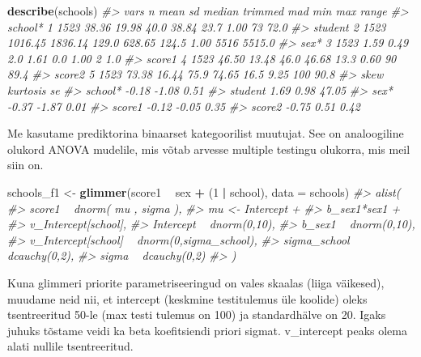 \documentclass[]{book}
\newenvironment{Shaded}{\begin{snugshade}}{\end{snugshade}}
\newcommand{\KeywordTok}[1]{\textcolor[rgb]{0.13,0.29,0.53}{\textbf{#1}}}
\newcommand{\DataTypeTok}[1]{\textcolor[rgb]{0.13,0.29,0.53}{#1}}
\newcommand{\DecValTok}[1]{\textcolor[rgb]{0.00,0.00,0.81}{#1}}
\newcommand{\StringTok}[1]{\textcolor[rgb]{0.31,0.60,0.02}{#1}}
\newcommand{\CommentTok}[1]{\textcolor[rgb]{0.56,0.35,0.01}{\textit{#1}}}
\newcommand{\OperatorTok}[1]{\textcolor[rgb]{0.81,0.36,0.00}{\textbf{#1}}}
\newcommand{\NormalTok}[1]{#1}
\begin{document}
\begin{Shaded}
\begin{Highlighting}[]
\KeywordTok{describe}\NormalTok{(schools)}
\CommentTok{#>         vars    n    mean      sd median trimmed   mad  min  max  range}
\CommentTok{#> school*    1 1523   38.36   19.98   40.0   38.84  23.7 1.00   73   72.0}
\CommentTok{#> student    2 1523 1016.45 1836.14  129.0  628.65 124.5 1.00 5516 5515.0}
\CommentTok{#> sex*       3 1523    1.59    0.49    2.0    1.61   0.0 1.00    2    1.0}
\CommentTok{#> score1     4 1523   46.50   13.48   46.0   46.68  13.3 0.60   90   89.4}
\CommentTok{#> score2     5 1523   73.38   16.44   75.9   74.65  16.5 9.25  100   90.8}
\CommentTok{#>          skew kurtosis    se}
\CommentTok{#> school* -0.18    -1.08  0.51}
\CommentTok{#> student  1.69     0.98 47.05}
\CommentTok{#> sex*    -0.37    -1.87  0.01}
\CommentTok{#> score1  -0.12    -0.05  0.35}
\CommentTok{#> score2  -0.75     0.51  0.42}
\end{Highlighting}
\end{Shaded}

Me kasutame prediktorina binaarset kategoorilist muutujat. See on
analoogiline olukord ANOVA mudelile, mis võtab arvesse multiple testingu
olukorra, mis meil siin on.

\begin{Shaded}
\begin{Highlighting}[]
\NormalTok{schools_f1 <-}\StringTok{ }\KeywordTok{glimmer}\NormalTok{(score1 }\OperatorTok{~}\StringTok{ }\NormalTok{sex }\OperatorTok{+}\StringTok{ }\NormalTok{(}\DecValTok{1} \OperatorTok{|}\StringTok{ }\NormalTok{school), }\DataTypeTok{data =}\NormalTok{ schools)}
\CommentTok{#> alist(}
\CommentTok{#>     score1 ~ dnorm( mu , sigma ),}
\CommentTok{#>     mu <- Intercept +}
\CommentTok{#>         b_sex1*sex1 +}
\CommentTok{#>         v_Intercept[school],}
\CommentTok{#>     Intercept ~ dnorm(0,10),}
\CommentTok{#>     b_sex1 ~ dnorm(0,10),}
\CommentTok{#>     v_Intercept[school] ~ dnorm(0,sigma_school),}
\CommentTok{#>     sigma_school ~ dcauchy(0,2),}
\CommentTok{#>     sigma ~ dcauchy(0,2)}
\CommentTok{#> )}
\end{Highlighting}
\end{Shaded}

Kuna glimmeri priorite parametriseeringud on vales skaalas (liiga
väikesed), muudame neid nii, et intercept (keskmine testitulemus üle
koolide) oleks tsentreeritud 50-le (max testi tulemus on 100) ja
standardhälve on 20. Igaks juhuks tõstame veidi ka beta koefitsiendi
priori sigmat. v\_intercept peaks olema alati nullile tsentreeritud.
\end{document}

